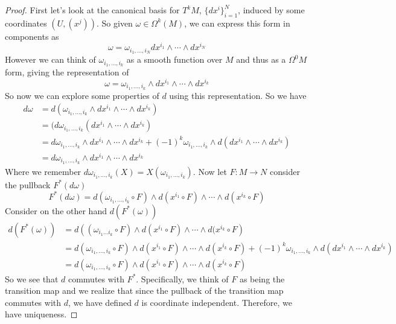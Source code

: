 \documentclass[a4paper]{article}
\begin{document}
\begin{proof}
  First let's look at the canonical basis for $T^kM$, $\{dx^i\}_{i=1}^N$, induced by some coordinates $(U,(x^j))$. So given $\omega \in \Omega^k(M)$, we can express this form in components as
  \[
    \omega = \omega_{i_1, \dots, i_N} dx^{i_1} \wedge \cdots \wedge dx^{i_N}
  \]
  However we can think of $\omega_{i_1, \dots, i_k}$ as a smooth function over $M$ and thus as a $\Omega^0M$ form, giving the representation of 
  \[
    \omega = \omega_{i_1, \dots, i_k} \wedge dx^{i_1} \wedge \cdots \wedge dx^{i_k}
  \]
  So now we can explore some properties of $d$ using this representation. So we have 
  \[
    \begin{aligned}
      d\omega &= d \left( \omega_{i_1, \dots, i_k} \wedge dx^{i_1} \wedge \cdots \wedge dx^{i_k} \right) \\
                &=(d\omega_{i_1, \dots, i_k} \left(dx^{i_1} \wedge \cdots \wedge dx^{i_k} \right) \\
                &= d\omega_{i_1, \dots, i_k} \wedge dx^{i_1} \wedge \cdots \wedge dx^{i_k} + (-1)^k \omega_{i_1, \dots, i_k} \wedge d(dx^{i_1} \wedge \cdots \wedge dx^{i_k}) \\
                &= d\omega_{i_1, \dots, i_k} \wedge dx^{i_1} \wedge \cdots \wedge dx^{i_k}
    \end{aligned}
  \]
  Where we remember $d\omega_{i_1, \dots, i_k}(X) = X(\omega_{i_1, \dots, i_k})$. Now let $F:M \rightarrow N$ consider the pullback $F^*(d\omega)$ 
  \[
    F^*(d\omega)= d(\omega_{i_1, \dots, i_k} \circ F) \wedge d(x^{i_1} \circ F) \wedge \cdots \wedge d(x^{i_k} \circ F)
  \]
  Consider on the other hand $d(F^*(\omega))$
  \[
    \begin{aligned}
      d(F^*(\omega)) &= d \left((\omega_{i_1 \dots i_k} \circ F) \wedge d(x^{i_1} \circ F) \wedge \cdots \wedge d(x^{i_k} \circ F\right) \\
                     &= d(\omega_{i_1, \dots, i_k} \circ F) \wedge d(x^{i_1} \circ F) \wedge \cdots \wedge d(x^{i_k} \circ F) + (-1)^k \omega_{i_1, \dots, i_k} \wedge d(dx^{i_1} \wedge \cdots \wedge dx^{i_k}) \\
                     &=d(\omega_{i_1, \dots, i_k} \circ F) \wedge d(x^{i_1} \circ F) \wedge \cdots \wedge d(x^{i_k} \circ F) 
    \end{aligned}
  \]
  So we see that $d$ commutes with $F^*$. Specifically, we think of $F$ as being the transition map and we realize that since the pullback of the transition map commutes with $d$, we have defined $d$ is coordinate independent. Therefore, we have uniqueness.
\end{proof}
\end{document}
